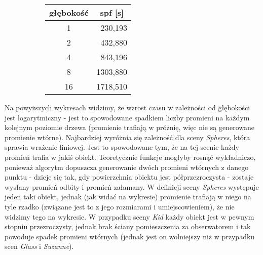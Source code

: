 \begin{figure}[!htb]
\advance\leftskip-2cm
\begin{subfigure}{.5\textwidth}
\end{subfigure}
\hspace{2cm}
\begin{subfigure}{.5\textwidth}
		\begin{longtable}{|c|r|} \hline
	    głębokość & \multicolumn{1}{|c|}{spf [s]} \\ \hline
		1 & 230,193 \\
		2 & 432,880 \\
		4 & 843,196 \\ 
		8 & 1303,880 \\
		16 & 1718,510 \\
		\hline
		\end{longtable}
\end{subfigure}
\end{figure}

Na powyższych wykresach widzimy, że wzrost czasu w zależności od głębokości jest logarytmiczny - jest to spowodowane spadkiem liczby promieni na każdym kolejnym poziomie drzewa (promienie trafiają w próżnię, więc nie są generowane promienie wtórne). Najbardziej wyróżnia się zależność dla sceny \emph{Spheres}, która sprawia wrażenie liniowej. Jest to spowodowane tym, że na tej scenie każdy promień trafia w jakiś obiekt. Teoretycznie funkcje mogłyby rosnąć wykładniczo, ponieważ algorytm dopuszcza generowanie dwóch promieni wtórnych z danego punktu - dzieje się tak, gdy powierzchnia obiektu jest półprzezroczysta - zostaje wysłany promień odbity i promień załamany. W definicji sceny \emph{Spheres} występuje jeden taki obiekt, jednak (jak widać na wykresie) promienie trafiają w niego na tyle rzadko (związane jest to z jego rozmiarami i umiejscowieniem), że nie widzimy tego na wykresie. W przypadku sceny \emph{Kid} każdy obiekt jest w pewnym stopniu przezroczysty, jednak brak ściany pomieszczenia za obserwatorem i tak powoduje spadek promieni wtórnych (jednak jest on wolniejszy niż w przypadku scen \emph{Glass} i \emph{Suzanne}).


